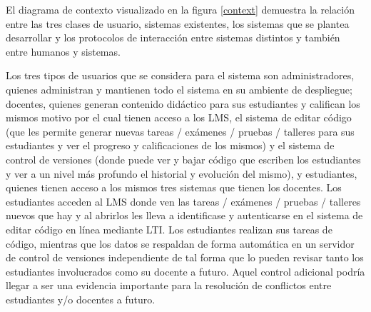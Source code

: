 El diagrama de contexto visualizado en la figura \ref{context} demuestra la relación entre las tres clases de usuario, sistemas existentes, los sistemas que se plantea desarrollar y los protocolos de interacción entre sistemas distintos y también entre humanos y sistemas.

      
Los tres tipos de usuarios que se considera para el sistema son administradores, quienes administran y mantienen todo el sistema en su ambiente de despliegue; docentes, quienes generan contenido didáctico para sus estudiantes y califican los mismos motivo por el cual tienen acceso a los LMS, el sistema de editar código (que les permite generar nuevas tareas / exámenes / pruebas / talleres para sus estudiantes y ver el progreso y calificaciones de los mismos) y el sistema de control de versiones (donde puede ver y bajar código que escriben los estudiantes y ver a un nivel más profundo el historial y evolución del mismo), y estudiantes, quienes tienen acceso a los mismos tres sistemas que tienen los docentes. Los estudiantes acceden al LMS  donde ven las tareas / exámenes / pruebas / talleres nuevos que hay y al abrirlos les lleva a identificase y autenticarse en el sistema de editar código en línea mediante LTI. Los estudiantes realizan sus tareas de código, mientras que los datos se respaldan de forma automática en un servidor de control de versiones independiente de tal forma que lo pueden revisar tanto los estudiantes involucrados como su docente a futuro. Aquel control adicional podría llegar a ser una evidencia importante para la resolución de conflictos entre estudiantes y/o docentes a futuro.

